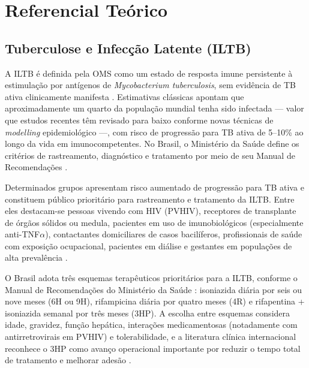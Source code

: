 \documentclass[
  12pt,
  oneside,
  a4paper,
  english,
  brazil
]{abntex2}
\begin{document}
\chapter{Referencial Teórico}
\label{cap:referencial}

\section{Tuberculose e Infecção Latente (ILTB)}

A ILTB é definida pela OMS como um estado de resposta imune persistente à
estimulação por antígenos de \textit{Mycobacterium tuberculosis}, sem
evidência de TB ativa clinicamente manifesta \cite{who2018}. Estimativas
clássicas \cite{who2023} apontam que aproximadamente um quarto da
população mundial tenha sido infectada --- valor que estudos recentes
têm revisado para baixo conforme novas técnicas de \textit{modelling}
epidemiológico ---, com risco de progressão para TB ativa de 5--10\%
ao longo da vida em imunocompetentes. No Brasil, o Ministério da Saúde
define os critérios de rastreamento, diagnóstico e tratamento por meio
de seu Manual de Recomendações \cite{brasil2022}.

Determinados grupos apresentam risco aumentado de progressão para TB ativa e
constituem público prioritário para rastreamento e tratamento da ILTB. Entre eles
destacam-se pessoas vivendo com HIV (PVHIV), receptores de transplante de órgãos
sólidos ou medula, pacientes em uso de imunobiológicos (especialmente
anti-TNF$\alpha$), contactantes domiciliares de casos bacilíferos, profissionais de
saúde com exposição ocupacional, pacientes em diálise e gestantes em populações de
alta prevalência \cite{who2018, brasil2022}.

O Brasil adota três esquemas terapêuticos prioritários para a ILTB, conforme o
Manual de Recomendações do Ministério da Saúde \cite{brasil2022}: isoniazida diária
por seis ou nove meses (6H ou 9H), rifampicina diária por quatro meses (4R) e
rifapentina + isoniazida semanal por três meses (3HP). A escolha entre esquemas
considera idade, gravidez, função hepática, interações medicamentosas (notadamente
com antirretrovirais em PVHIV) e tolerabilidade, e a literatura clínica
internacional reconhece o 3HP como avanço operacional importante por reduzir o
tempo total de tratamento e melhorar adesão \cite{who2018, who2020consolidatedTB,
who2023}.
\end{document}

